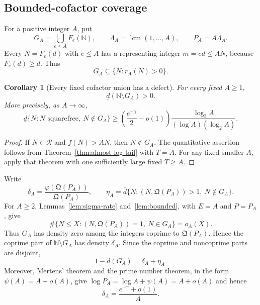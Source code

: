 \documentclass[11pt]{article}
\newtheorem{corollary}[theorem]{Corollary}
\theoremstyle{remark}
\newcommand{\N}{\mathbb N}
\newcommand{\Rcal}{\mathcal R}
\newcommand{\1}{\mathbf 1}
\newcommand{\lowerdens}{\underline d}
\newcommand{\upperdens}{\overline d}
\DeclareMathOperator{\lcm}{lcm}
\begin{document}
\subsection{Bounded-cofactor coverage}

For a positive integer $A$, put
\[
 G_A=\bigcup_{e\leq A}F_e(\N),\qquad
 \Lambda_A=\lcm(1,\ldots,A),\qquad P_A=A\Lambda_A.
\]
Every $N=F_e(d)$ with
$e\leq A$ has a representing integer $m=ed\leq AN$, because $F_e(d)\geq d$.
Thus
\begin{equation}\label{eq:GA-sufficient}
 G_A\subseteq\{N:r_A(N)>0\}.
\end{equation}

\begin{corollary}[Every fixed cofactor union has a defect]
\label{cor:fixed-cofactor-defect}
For every fixed $A\geq1$,
\[
 \lowerdens(\N\setminus G_A)>0.
\]
More precisely, as $A\to\infty$,
\begin{equation}\label{eq:fixed-cofactor-defect}
 \lowerdens\{N:N\text{ squarefree},\ N\notin G_A\}
 \geq\left(\frac{e^{-\gamma}}2-o(1)\right)
       \frac{\log_3A}{(\log A)(\log_2A)}.
\end{equation}
\end{corollary}

\begin{proof}
If $N\in\Rcal$ and $f(N)>AN$, then $N\notin G_A$.  The quantitative
assertion follows from Theorem~\ref{thm:almost-log-tail} with $T=A$.
For any fixed smaller $A$, apply that theorem with one sufficiently large
fixed $T\geq A$.
\end{proof}

Write
\[
 \delta_A=\frac{\varphi(\mathfrak Q(P_A))}{\mathfrak Q(P_A)},\qquad
 \eta_A=\upperdens\{N:(N,\mathfrak Q(P_A))>1,\ N\notin G_A\}.
\]
For $A\geq2$, Lemmas~\ref{lem:sigma-rate} and~\ref{lem:bounded}, with
$E=A$ and $P=P_A$, give
\[
 \#\{N\leq X:(N,\mathfrak Q(P_A))=1,\ N\in G_A\}=o_A(X).
\]
Thus $G_A$ has density zero among the integers coprime to
$\mathfrak Q(P_A)$.  Hence the coprime part of $\N\setminus G_A$ has density
$\delta_A$.  Since the coprime and noncoprime parts are disjoint,
\begin{equation}\label{eq:bounded-cofactor-complement}
 1-\lowerdens(G_A)=\delta_A+\eta_A.
\end{equation}
Moreover, Mertens' theorem and the prime number theorem, in the form
$\psi(A)=A+o(A)$, give
$\log P_A=\log A+\psi(A)=A+o(A)$ and hence
\begin{equation}\label{eq:delta-A-asymptotic}
 \delta_A=\frac{e^{-\gamma}+o(1)}A.
\end{equation}
\end{document}
